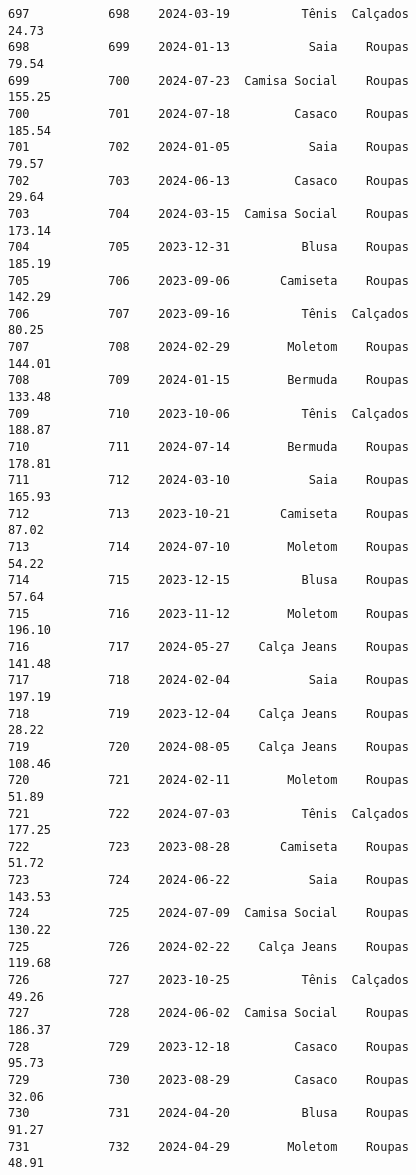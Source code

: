 \documentclass[11pt]{article}
\begin{document}
\begin{Verbatim}[commandchars=\\\{\}]
697           698    2024-03-19          Tênis  Calçados           24.73   
698           699    2024-01-13           Saia    Roupas           79.54   
699           700    2024-07-23  Camisa Social    Roupas          155.25   
700           701    2024-07-18         Casaco    Roupas          185.54   
701           702    2024-01-05           Saia    Roupas           79.57   
702           703    2024-06-13         Casaco    Roupas           29.64   
703           704    2024-03-15  Camisa Social    Roupas          173.14   
704           705    2023-12-31          Blusa    Roupas          185.19   
705           706    2023-09-06       Camiseta    Roupas          142.29   
706           707    2023-09-16          Tênis  Calçados           80.25   
707           708    2024-02-29        Moletom    Roupas          144.01   
708           709    2024-01-15        Bermuda    Roupas          133.48   
709           710    2023-10-06          Tênis  Calçados          188.87   
710           711    2024-07-14        Bermuda    Roupas          178.81   
711           712    2024-03-10           Saia    Roupas          165.93   
712           713    2023-10-21       Camiseta    Roupas           87.02   
713           714    2024-07-10        Moletom    Roupas           54.22   
714           715    2023-12-15          Blusa    Roupas           57.64   
715           716    2023-11-12        Moletom    Roupas          196.10   
716           717    2024-05-27    Calça Jeans    Roupas          141.48   
717           718    2024-02-04           Saia    Roupas          197.19   
718           719    2023-12-04    Calça Jeans    Roupas           28.22   
719           720    2024-08-05    Calça Jeans    Roupas          108.46   
720           721    2024-02-11        Moletom    Roupas           51.89   
721           722    2024-07-03          Tênis  Calçados          177.25   
722           723    2023-08-28       Camiseta    Roupas           51.72   
723           724    2024-06-22           Saia    Roupas          143.53   
724           725    2024-07-09  Camisa Social    Roupas          130.22   
725           726    2024-02-22    Calça Jeans    Roupas          119.68   
726           727    2023-10-25          Tênis  Calçados           49.26   
727           728    2024-06-02  Camisa Social    Roupas          186.37   
728           729    2023-12-18         Casaco    Roupas           95.73   
729           730    2023-08-29         Casaco    Roupas           32.06   
730           731    2024-04-20          Blusa    Roupas           91.27   
731           732    2024-04-29        Moletom    Roupas           48.91   

\end{Verbatim}
\end{document}
